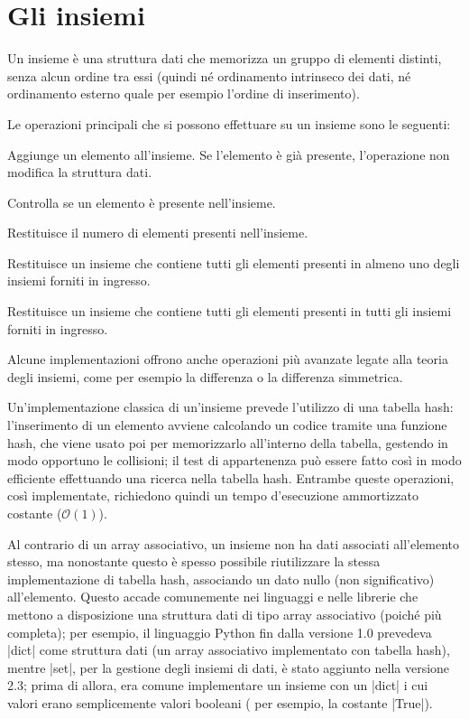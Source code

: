 \section{Gli insiemi}

Un insieme è una struttura dati che memorizza un gruppo di elementi distinti, senza alcun ordine tra
essi (quindi né ordinamento intrinseco dei dati, né ordinamento esterno quale per esempio l'ordine
di inserimento).

Le operazioni principali che si possono effettuare su un insieme sono le seguenti:

\begin{description}[labelindent=2\parindent,labelwidth=10em,leftmargin=!,font=\normalfont\bfseries]
	\item[Inserimento] Aggiunge un elemento all'insieme. Se l'elemento è già presente,
	l'operazione non modifica la struttura dati.

	\item[Test di appartenenza] Controlla se un elemento è presente nel\-l'in\-sie\-me.

	\item[Cardinalità] Restituisce il numero di elementi presenti nell'in\-sie\-me.

	\item[Unione] Restituisce un insieme che contiene tutti gli elementi presenti in almeno
	uno degli insiemi forniti in ingresso.

	\item[Intersezione] Restituisce un insieme che contiene tutti gli e\-le\-men\-ti
	presenti in tutti gli insiemi forniti in ingresso.
\end{description}

Alcune implementazioni offrono anche operazioni più avanzate legate alla teoria degli insiemi,
come per esempio la differenza o la differenza simmetrica. 

Un'implementazione classica di un'insieme prevede l'utilizzo di una tabella hash: l'inserimento di
un elemento avviene calcolando un codice tramite una funzione hash, che viene usato poi per
memorizzarlo all'interno della tabella, gestendo in modo opportuno le collisioni; il test di
appartenenza può essere fatto così in modo efficiente effettuando una ricerca nella tabella hash.
Entrambe queste operazioni, così implementate, richiedono quindi un tempo d'esecuzione ammortizzato
costante ($\mathcal{O}(1)$).

Al contrario di un array associativo, un insieme non ha dati associati all'elemento stesso, ma
nonostante questo è spesso possibile riutilizzare la stessa implementazione di tabella hash,
associando un dato nullo (non significativo) all'elemento. Questo accade comunemente nei linguaggi e
nelle librerie che mettono a disposizione una struttura dati di tipo array associativo (poiché più
completa); per esempio, il linguaggio Python fin dalla versione 1.0 prevedeva \cverb|dict| come
struttura dati (un array associativo implementato con tabella hash), mentre \cverb|set|, per la
gestione degli insiemi di dati, è stato aggiunto nella versione 2.3; prima di allora, era comune
implementare un insieme con un \cverb|dict| i cui valori erano semplicemente valori booleani (
per esempio, la costante \cverb|True|).

